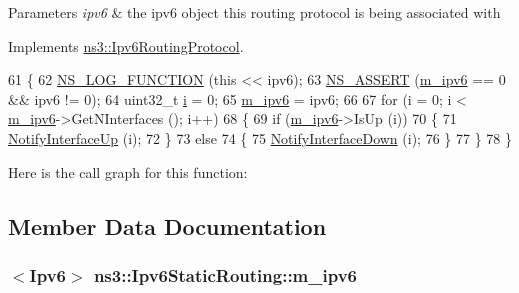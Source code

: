 \begin{DoxyParams}{Parameters}
{\em ipv6} & the ipv6 object this routing protocol is being associated with \\
\hline
\end{DoxyParams}


Implements \hyperlink{classns3_1_1Ipv6RoutingProtocol_ab97e8194b12a2db1d1374fc881974903}{ns3\+::\+Ipv6\+Routing\+Protocol}.


\begin{DoxyCode}
61 \{
62   \hyperlink{log-macros-disabled_8h_a90b90d5bad1f39cb1b64923ea94c0761}{NS\_LOG\_FUNCTION} (\textcolor{keyword}{this} << ipv6);
63   \hyperlink{assert_8h_a6dccdb0de9b252f60088ce281c49d052}{NS\_ASSERT} (\hyperlink{classns3_1_1Ipv6StaticRouting_aeb0293ac3549a6ca0ba7674d35646fc8}{m\_ipv6} == 0 && ipv6 != 0);
64   uint32\_t \hyperlink{bernuolliDistribution_8m_a6f6ccfcf58b31cb6412107d9d5281426}{i} = 0;
65   \hyperlink{classns3_1_1Ipv6StaticRouting_aeb0293ac3549a6ca0ba7674d35646fc8}{m\_ipv6} = ipv6;
66 
67   \textcolor{keywordflow}{for} (i = 0; i < \hyperlink{classns3_1_1Ipv6StaticRouting_aeb0293ac3549a6ca0ba7674d35646fc8}{m\_ipv6}->GetNInterfaces (); i++)
68     \{
69       \textcolor{keywordflow}{if} (\hyperlink{classns3_1_1Ipv6StaticRouting_aeb0293ac3549a6ca0ba7674d35646fc8}{m\_ipv6}->IsUp (i))
70         \{
71           \hyperlink{classns3_1_1Ipv6StaticRouting_a9750930029ffe2eaafda77ba77918472}{NotifyInterfaceUp} (i);
72         \}
73       \textcolor{keywordflow}{else}
74         \{
75           \hyperlink{classns3_1_1Ipv6StaticRouting_a1e917452e99ee697b9ffd5acebfc0a02}{NotifyInterfaceDown} (i);
76         \}
77     \}
78 \}
\end{DoxyCode}


Here is the call graph for this function\+:




\subsection{Member Data Documentation}
\subsubsection[{\texorpdfstring{m\+\_\+ipv6}{m_ipv6}}]{$<${\bf Ipv6}$>$ ns3\+::\+Ipv6\+Static\+Routing\+::m\+\_\+ipv6\hspace{0.3cm}{\ttfamily [private]}}\hypertarget{classns3_1_1Ipv6StaticRouting_aeb0293ac3549a6ca0ba7674d35646fc8}{}\label{classns3_1_1Ipv6StaticRouting_aeb0293ac3549a6ca0ba7674d35646fc8}


